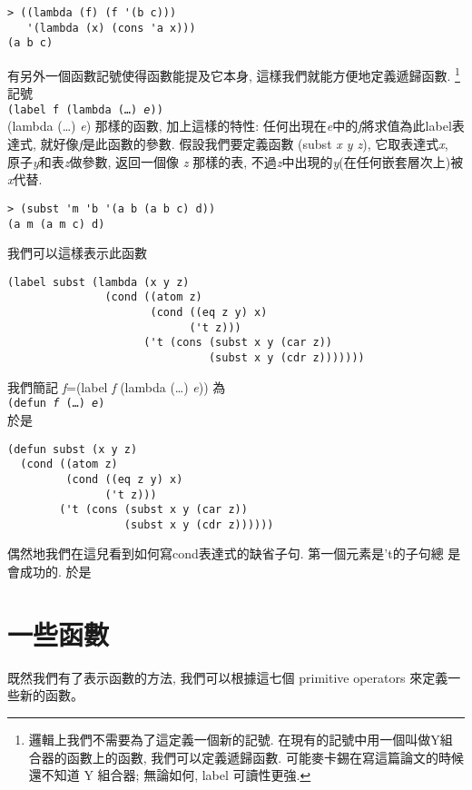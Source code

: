 \documentclass[12pt]{article}
\begin{document}
\begin{CJK}{UTF8}{bsmi}
\begin{verbatim} 
> ((lambda (f) (f '(b c))) 
   '(lambda (x) (cons 'a x))) 
(a b c) 
\end{verbatim} 
有另外一個函數記號使得函數能提及它本身, 這樣我們就能方便地定義遞歸函數.
\footnote{邏輯上我們不需要為了這定義一個新的記號. 
在現有的記號中用一個叫做Y組合器的函數上的函數, 
我們可以定義遞歸函數. 
可能麥卡錫在寫這篇論文的時候還不知道 Y 組合器; 
無論如何, label 可讀性更強.} 
記號\\ 
{\tt (label f (lambda (\pone\dots\pn) {\it e})) }\\
 (lambda (\pone\dots\pn) {\it e}) 那樣的函數,
加上這樣的特性: 
任何出現在{\it e}中的{\it f}將求值為此label表達式, 就好像{\it f}是此函數的參數. 
假設我們要定義函數 (subst {\it x y z}), 
它取表達式{\it x}, 原子{\it y}和表{\it z}做參數, 返回一個像 {\it z} 那樣的表, 
不過{\it z}中出現的{\it y}(在任何嵌套層次上)被{\it x}代替. 
\begin{verbatim} 
> (subst 'm 'b '(a b (a b c) d)) 
(a m (a m c) d) 
\end{verbatim} 
我們可以這樣表示此函數 
\begin{verbatim} 
(label subst (lambda (x y z) 
               (cond ((atom z) 
                      (cond ((eq z y) x) 
                            ('t z))) 
                     ('t (cons (subst x y (car z)) 
                               (subst x y (cdr z))))))) 
\end{verbatim} 
我們簡記 {\it f}=(label {\it f} (lambda (\pone\dots\pn) {\it e}))
為\\ 
{\tt (defun {\it f} (\pone\dots\pn) {\it e}) } \\
於是 
\begin{verbatim} 
(defun subst (x y z) 
  (cond ((atom z) 
         (cond ((eq z y) x) 
               ('t z))) 
        ('t (cons (subst x y (car z)) 
                  (subst x y (cdr z)))))) 
\end{verbatim} 
偶然地我們在這兒看到如何寫cond表達式的缺省子句. 
第一個元素是't的子句總 
是會成功的. 
於是 
\section{一些函數} 
既然我們有了表示函數的方法, 我們可以根據這七個 primitive operators 來定義一些新的函數。


\end{CJK}
\end{document}
